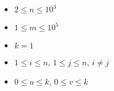\begin{itemize}
\tightlist
\item $2 \le n \le 10^3$
\item $1 \le m \le 10^5$
\item $k = 1$
\item $1 \le i \le n ,\,1\le j \le n ,\, i \ne j$
\item $0 \le u \le k ,\,0\le v \le k$
\end{itemize}
